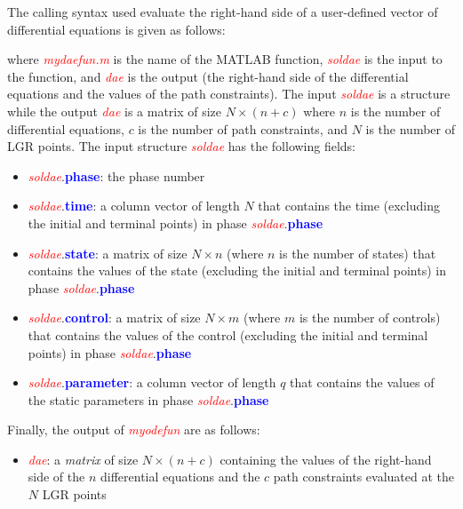 \documentclass[10pt]{article}
\newcommand{\bfblue}[1]{\textcolor{blue}{\bf #1}}
\newcommand{\slred}[1]{\textcolor{red}{\sl #1}}
\begin{document}
The calling syntax used evaluate the right-hand side of a user-defined vector
of differential equations is given as follows:
\begin{center}
\end{center}
{\noindent}where \slred{mydaefun.m} is the name of the MATLAB function,
\slred{soldae} is the input to the function, and
\slred{dae} is the output (\ie the right-hand side of the
differential equations and the values of the path constraints).  The
input \slred{soldae} is a structure while the output \slred{dae} is a
matrix of size $N \times (n+c)$ where $n$ is the number of
differential equations, $c$ is the number of path constraints, and $N$
is the number of LGR points.  The input structure \slred{soldae} has
the following fields:
\begin{itemize}
  \item \slred{soldae}.\bfblue{phase}:  the phase number
  \item \slred{soldae}.\bfblue{time}:  a column vector of length $N$ that
    contains the time (excluding the initial and terminal points) in phase \slred{soldae}.\bfblue{phase}
  \item \slred{soldae}.\bfblue{state}:  a matrix of size $N\times n$ (where $n$
    is the number of states) that contains the values of the state (excluding the initial and
    terminal points) in phase \slred{soldae}.\bfblue{phase}
  \item \slred{soldae}.\bfblue{control}:  a matrix of size $N\times m$ (where $m$
    is the number of controls) that contains the values of the control (excluding the initial and
    terminal points) in phase \slred{soldae}.\bfblue{phase}
  \item \slred{soldae}.\bfblue{parameter}:  a column vector of length $q$ that
    contains the values of the static parameters in phase \slred{soldae}.\bfblue{phase}
\end{itemize}
Finally, the output of \slred{myodefun} are as follows:
\begin{itemize}
  \item \slred{dae}: a {\em matrix} of size $N\times (n+c)$ containing
    the values of the right-hand side of the $n$ differential
    equations and the $c$ path constraints evaluated at the $N$ LGR points
\end{itemize}
\end{document}
